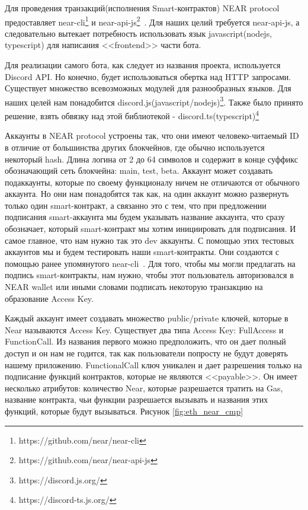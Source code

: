 
    Для проведения транзакций(исполнения Smart-контрактов) NEAR protocol предоставляет near-cli\footnote{https://github.com/near/near-cli} и near-api-js\footnote{https://github.com/near/near-api-js}~\cite*{docsnear}. Для наших целий требуется near-api-js, а следовательно вытекает потребность использовать язык javascript(nodejs, typescript) для написания <<frontend>> части бота.

    Для реализации самого бота, как следует из названия проекта, используется Discord API. Но конечно, будет использоваться обертка над HTTP запросами. Существует множество всевозможных модулей для разнообразных языков. Для наших целей нам понадобится discord.js(javascript/nodejs)\footnote{https://discord.js.org/}. Также было принято решение, взять обвязку над этой библиотекой - discord.ts(typescript)\footnote{https://discord-ts.js.org/}  


		Аккаунты в NEAR protocol устроены так, что они имеют человеко-читаемый ID в отличие от большинства других блокчейнов, где обычно используется некоторый hash. Длина логина от 2 до 64 символов и содержит в конце суффикс обозначающий сеть блокчейна: main, test, beta. Аккаунт может создавать подаккаунты, которые по своему функционалу ничем не отличаются от обычного аккаунта. Но они нам понадобятся так как, на один аккаунт можно развернуть только один smart-контракт, а связанно это с тем, что при предложении подписания smart-аккаунта мы будем указывать название аккаунта, что сразу обозначает, который smart-контракт мы хотим инициировать для подписания. И самое главное, что нам нужно так это dev аккаунты. С помощью этих тестовых аккаунтов мы и будем тестировать наши smart-контракты. Они создаются с помощью ранее упомянутого near-cli~\cite*{docsnear}.
		Для того, чтобы мы могли предлагать на подпись smart-контракты, нам нужно, чтобы этот пользователь авторизовался в NEAR wallet или иными словами подписать некоторую транзакцию на образование Access Key.
		
		Каждый аккаунт имеет создавать множество public/private ключей, которые в Near называются Access Key. Существует два типа Access Key: FullAccess и FunctionCall. Из названия первого можно предположить, что он дает полный доступ и он нам не годится, так как пользователи попросту не будут доверять нашему приложению. FunctionalCall ключ уникален и дает разрешения только на подписание функций контрактов, которые не являются <<payable>>. Он имеет несколько атрибутов: количество Near, которые разрешается тратить на Gas, название контракта, чьи функции разрешается вызывать и названия этих функций, которые будут вызываться. Рисунок \ref{fig:eth_near_cmp}

